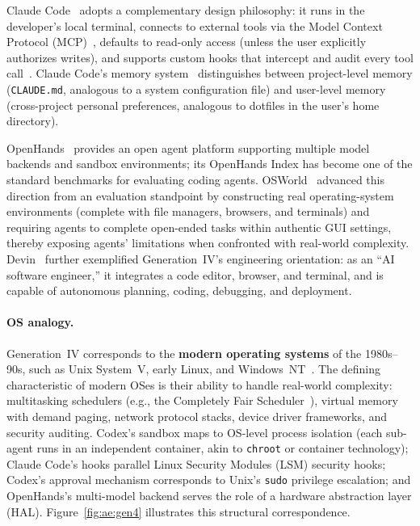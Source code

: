 Claude Code~\cite{anthropic_claudecode_overview_2026} adopts a complementary design philosophy: it runs in the developer's local terminal, connects to external tools via the Model Context Protocol (MCP)~\cite{mcp_intro_2026}, defaults to read-only access (unless the user explicitly authorizes writes), and supports custom hooks that intercept and audit every tool call~\cite{anthropic_claudecode_security_2026}.
Claude Code's memory system~\cite{anthropic_claudecode_memory_2026} distinguishes between project-level memory (\texttt{CLAUDE.md}, analogous to a system configuration file) and user-level memory (cross-project personal preferences, analogous to dotfiles in the user's home directory).

OpenHands~\cite{openhands_paper_2025} provides an open agent platform supporting multiple model backends and sandbox environments; its OpenHands Index has become one of the standard benchmarks for evaluating coding agents.
OSWorld~\cite{osworld2024} advanced this direction from an evaluation standpoint by constructing real operating-system environments (complete with file managers, browsers, and terminals) and requiring agents to complete open-ended tasks within authentic GUI settings, thereby exposing agents' limitations when confronted with real-world complexity.
Devin~\cite{devin2024cognition} further exemplified Generation~IV's engineering orientation: as an ``AI software engineer,'' it integrates a code editor, browser, and terminal, and is capable of autonomous planning, coding, debugging, and deployment.

\paragraph{OS analogy.}
Generation~IV corresponds to the \textbf{modern operating systems} of the 1980s--90s, such as Unix System~V, early Linux, and Windows~NT~\cite{ostep_2023}.
The defining characteristic of modern OSes is their ability to handle real-world complexity: multitasking schedulers (e.g., the Completely Fair Scheduler~\cite{linux_cfs_2026}), virtual memory with demand paging, network protocol stacks, device driver frameworks, and security auditing.
Codex's sandbox maps to OS-level process isolation (each sub-agent runs in an independent container, akin to \texttt{chroot} or container technology); Claude Code's hooks parallel Linux Security Modules (LSM) security hooks; Codex's approval mechanism corresponds to Unix's \texttt{sudo} privilege escalation; and OpenHands's multi-model backend serves the role of a hardware abstraction layer (HAL).
Figure~\ref{fig:ae:gen4} illustrates this structural correspondence.


